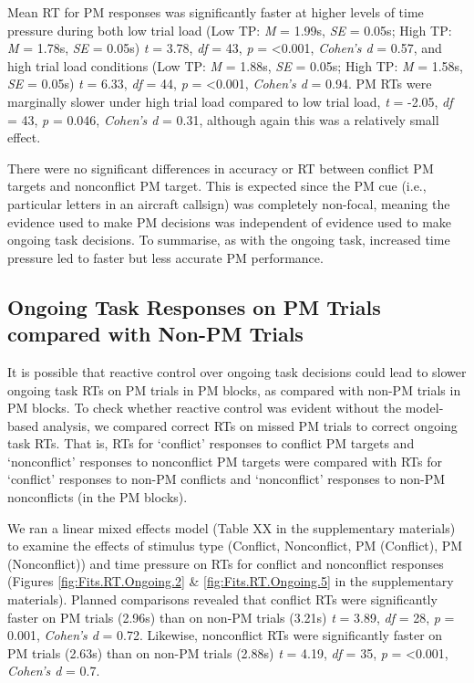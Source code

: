 \documentclass[11pt,]{article}
\begin{document}
Mean RT for PM responses was significantly faster at higher levels of
time pressure during both low trial load (Low TP: \emph{M} = 1.99s,
\emph{SE} = 0.05s; High TP: \emph{M} = 1.78s, \emph{SE} = 0.05s)
\emph{t} = 3.78, \emph{df} = 43, \emph{p} = \textless{}0.001,
\emph{Cohen's d} = 0.57, and high trial load conditions (Low TP:
\emph{M} = 1.88s, \emph{SE} = 0.05s; High TP: \emph{M} = 1.58s,
\emph{SE} = 0.05s) \emph{t} = 6.33, \emph{df} = 44, \emph{p} =
\textless{}0.001, \emph{Cohen's d} = 0.94. PM RTs were marginally slower
under high trial load compared to low trial load, \emph{t} = -2.05,
\emph{df} = 43, \emph{p} = 0.046, \emph{Cohen's d} = 0.31, although
again this was a relatively small effect.

There were no significant differences in accuracy or RT between conflict
PM targets and nonconflict PM target. This is expected since the PM cue
(i.e., particular letters in an aircraft callsign) was completely
non-focal, meaning the evidence used to make PM decisions was
independent of evidence used to make ongoing task decisions. To
summarise, as with the ongoing task, increased time pressure led to
faster but less accurate PM performance.

\subsection{Ongoing Task Responses on PM Trials compared with Non-PM
Trials}\label{ongoing-task-responses-on-pm-trials-compared-with-non-pm-trials}

It is possible that reactive control over ongoing task decisions could
lead to slower ongoing task RTs on PM trials in PM blocks, as compared
with non-PM trials in PM blocks. To check whether reactive control was
evident without the model-based analysis, we compared correct RTs on
missed PM trials to correct ongoing task RTs. That is, RTs for
`conflict' responses to conflict PM targets and `nonconflict' responses
to nonconflict PM targets were compared with RTs for `conflict'
responses to non-PM conflicts and `nonconflict' responses to non-PM
nonconflicts (in the PM blocks).

We ran a linear mixed effects model (Table XX in the supplementary
materials) to examine the effects of stimulus type (Conflict,
Nonconflict, PM (Conflict), PM (Nonconflict)) and time pressure on RTs
for conflict and nonconflict responses (Figures
\ref{fig:Fits.RT.Ongoing.2} \& \ref{fig:Fits.RT.Ongoing.5} in the
supplementary materials). Planned comparisons revealed that conflict RTs
were significantly faster on PM trials (2.96s) than on non-PM trials
(3.21s) \emph{t} = 3.89, \emph{df} = 28, \emph{p} = 0.001, \emph{Cohen's
d} = 0.72. Likewise, nonconflict RTs were significantly faster on PM
trials (2.63s) than on non-PM trials (2.88s) \emph{t} = 4.19, \emph{df}
= 35, \emph{p} = \textless{}0.001, \emph{Cohen's d} = 0.7.
\end{document}
